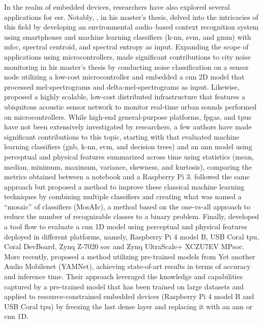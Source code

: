 In the realm of embedded devices, researchers have also explored several applications for \gls{esr}. Notably, \textcite{Abreha2014}, in his master's thesis, delved into the intricacies of this field by developing an environmental audio–based context recognition system using smartphones and machine learning classifiers (\gls{k-nn}, \gls{svm}, and \gls{gmm}) with \gls{mfcc}, spectral centroid, and spectral entropy as input. Expanding the scope of applications using microcontrollers, \textcite{Nordby2019} made significant contributions to city noise monitoring in his master’s thesis by conducting noise classification on a sensor node utilizing a low-cost microcontroller and embedded a \gls{cnn} 2D model that processed mel-spectrograms and delta-mel-spectrograms as input. Likewise, \textcite{VidaaVila2020} proposed a highly scalable, low-cost distributed infrastructure that features a ubiquitous acoustic sensor network to monitor real-time urban sounds performed on microcontrollers. While high-end general-purpose platforms, \gls{fpga}s, and \gls{tpu}s have not been extensively investigated by researchers, a few authors have made significant contributions to this topic, starting with \textcite{Silva2019} that evaluated machine learning classifiers (\gls{gnb}, \gls{k-nn}, \gls{svm}, and decision trees) and an \gls{ann} model using perceptual and physical features summarized across time using statistics (mean, median, minimum, maximum, variance, skewness, and kurtosis), comparing the metrics obtained between a notebook and a Raspberry Pi 3. \textcite{Lhoest2021} followed the same approach but proposed a method to improve these classical machine learning techniques by combining multiple classifiers and creating what was named a “mosaic” of classifiers (MosAIc), a method based on the one-vs-all approach to reduce the number of recognizable classes to a binary problem. Finally, \textcite{Vandendriessche2021} developed a tool flow to evaluate a \gls{cnn} 1D model using perceptual and physical features deployed in different platforms, namely, Raspberry Pi 4 model B, USB Coral \gls{tpu}, Coral DevBoard, Zynq Z-7020 \gls{soc} and Zynq UltraScale+ XCZU7EV MP\gls{soc}. More recently, \textcite{Lamrini2023} proposed a method utilizing pre-trained models from Yet another Audio Mobilenet (YAMNet), achieving state-of-art results in terms of accuracy and inference time. Their approach leveraged the knowledge and capabilities captured by a pre-trained model that has been trained on large datasets and applied to resource-constrained embedded devices (Raspberry Pi 4 model B and USB Coral \gls{tpu}) by freezing the last dense layer and replacing it with an \gls{ann} or \gls{cnn} 1D. 

